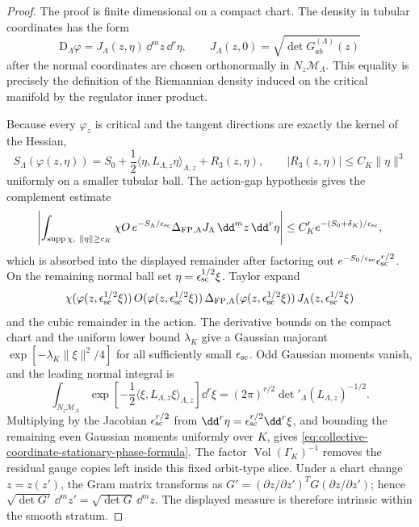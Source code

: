 \begin{proof}
The proof is finite dimensional on a compact chart.  The density in tubular
coordinates has the form
\[
  \mathrm D_\Lambda\varphi
  =
  J_\Lambda(z,\eta)\,\dd^mz\,\dd^r\eta,
  \qquad
  J_\Lambda(z,0)=\sqrt{\det G^{(\Lambda)}_{ab}(z)}
\]
after the normal coordinates are chosen orthonormally in
\(N_z\mathcal M_\Lambda\).  This equality is precisely the definition of the
Riemannian density induced on the critical manifold by the regulator inner
product.

Because every \(\varphi_z\) is critical and the tangent directions are
exactly the kernel of the Hessian,
\[
  S_\Lambda(\varphi(z,\eta))
  =
  S_0+\frac12\langle \eta,L_{\Lambda,z}\eta\rangle_{\Lambda,z}
  +R_3(z,\eta),
  \qquad |R_3(z,\eta)|\le C_K\|\eta\|^3
\]
uniformly on a smaller tubular ball.  The action-gap hypothesis gives the
complement estimate
\[
  \left|
  \int_{\operatorname{supp}\chi,\ \|\eta\|\ge c_K}
  \chi O\,e^{-S_\Lambda/\epsilon_{\rm sc}}
  \Delta_{\rm FP,\Lambda}J_\Lambda\,\dd^mz\,\dd^r\eta
  \right|
  \le C'_K e^{-(S_0+\delta_K)/\epsilon_{\rm sc}},
\]
which is absorbed into the displayed remainder after factoring out
\(e^{-S_0/\epsilon_{\rm sc}}\epsilon_{\rm sc}^{r/2}\).  On the remaining
normal ball set \(\eta=\epsilon_{\rm sc}^{1/2}\xi\).  Taylor expand
\[
  \chi(\varphi(z,\epsilon_{\rm sc}^{1/2}\xi))\,
  O(\varphi(z,\epsilon_{\rm sc}^{1/2}\xi))\,
  \Delta_{\rm FP,\Lambda}(\varphi(z,\epsilon_{\rm sc}^{1/2}\xi))\,
  J_\Lambda(z,\epsilon_{\rm sc}^{1/2}\xi)
\]
and the cubic remainder in the action.  The derivative bounds on the compact
chart and the uniform lower bound \(\lambda_K\) give a Gaussian majorant
\(\exp[-\lambda_K\|\xi\|^2/4]\) for all sufficiently small
\(\epsilon_{\rm sc}\).  Odd Gaussian moments vanish, and the leading normal
integral is
\[
  \int_{N_z\mathcal M_\Lambda}
  \exp\!\left[-\frac12
    \langle \xi,L_{\Lambda,z}\xi\rangle_{\Lambda,z}\right]\dd^r\xi
  =
  (2\pi)^{r/2}\det{}'_{\Lambda}(L_{\Lambda,z})^{-1/2}.
\]
Multiplying by the Jacobian
\(\epsilon_{\rm sc}^{r/2}\) from
\(\dd^r\eta=\epsilon_{\rm sc}^{r/2}\dd^r\xi\), and bounding the remaining even
Gaussian moments uniformly over \(K\), gives
\eqref{eq:collective-coordinate-stationary-phase-formula}.  The factor
\(\operatorname{Vol}(\Gamma_K)^{-1}\) removes the residual gauge copies left
inside this fixed orbit-type slice.  Under a chart change \(z=z(z')\), the Gram
matrix
transforms as \(G'=(\partial z/\partial z')^T G(\partial z/\partial z')\);
hence \(\sqrt{\det G'}\,\dd^mz'=\sqrt{\det G}\,\dd^mz\).  The displayed
measure is therefore intrinsic within the smooth stratum.
\end{proof}

